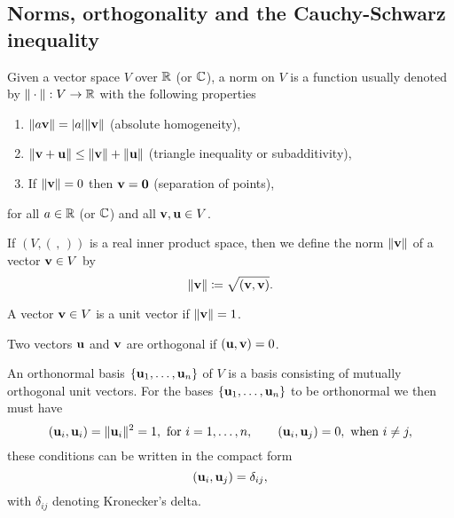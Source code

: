 \documentclass[10pt, a4paper]{article}
\begin{document}
\subsection{Norms, orthogonality and the Cauchy-Schwarz inequality}

\begin{definition}
    Given a vector space $V$ over $\mathbb{R}$
    (or $\mathbb{C}$),
    a norm on $V$ is a function usually denoted by $\|\cdot\| : V \rightarrow \mathbb{R}$ with the following properties
    \begin{enumerate}[label = (\roman*)]
        \item $\|a\mathbf{v}\| = |a|\|\mathbf{v}\|$
        (absolute homogeneity),

        \item $\|\mathbf{v} + \mathbf{u}\| \leq \|\mathbf{v}\| + \|\mathbf{u}\|$
        (triangle inequality or subadditivity),

        \item If $\|\mathbf{v}\| = 0$ then $\mathbf{v} = \mathbf{0}$
        (separation of points),
    \end{enumerate}
    for all $a \in \mathbb{R}$
    (or $\mathbb{C}$)
    and all $\mathbf{v}, \mathbf{u} \in V$.
\end{definition}

\begin{definition}
    If $(V, (\,,\,))$ is a real inner product space,
    then we define the norm $\|\mathbf{v}\|$ of a vector $\mathbf{v} \in V$ by
    \[
    \|\mathbf{v}\| \coloneqq \sqrt{(\mathbf{v}, \mathbf{v})}.
    \]
\end{definition}

\begin{definition}
    A vector $\mathbf{v} \in V$ is a unit vector if $\|\mathbf{v}\| = 1$.
\end{definition}

\begin{definition}
    Two vectors $\mathbf{u}$ and $\mathbf{v}$ are orthogonal if $(\mathbf{u}, \mathbf{v}) = 0$.
\end{definition}

\begin{definition}
    An orthonormal basis $\{\mathbf{u}_1, \dotsc, \mathbf{u}_n\}$ of $V$ is a basis consisting of mutually orthogonal unit vectors.
    For the bases $\{\mathbf{u}_1, \dotsc, \mathbf{u}_n\}$ to be orthonormal we then must have
    \[
    (\mathbf{u}_i, \mathbf{u}_i) = \|\mathbf{u}_i\| ^ 2 = 1, \text{ for } i = 1, \dotsc, n,\qquad(\mathbf{u}_i, \mathbf{u}_j) = 0, \text{ when } i \neq j,
    \]
    these conditions can be written in the compact form
    \[
    (\mathbf{u}_i, \mathbf{u}_j) = \delta_{ij},
    \]
    with $\delta_{ij}$ denoting Kronecker's delta.
\end{definition}
\end{document}

